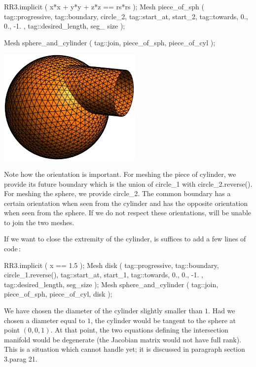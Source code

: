    RR3.implicit ( x*x + y*y + z*z == rs*rs );
   Mesh piece_of_sph ( tag::progressive, tag::boundary, circle_2,
                       tag::start_at, start_2, tag::towards, { 0., 0., -1. },
                       tag::desired_length, seg_ size                         );

   Mesh sphere_and_cylinder ( tag::join, piece_of_sph, piece_of_cyl );
\endverbatim

\medskip
\centerline{\includegraphics[width=70mm]{sphere-cyl.eps}}
\medskip

Note how the orientation is important.
For meshing the piece of cylinder, we provide its future boundary which is the union of
{\codett circle\_1} with {\codett circle\_2.reverse()}.
For meshing the sphere, we provide {\codett circle\_2}.
The common boundary has a certain orientation when seen from the cylinder and has the opposite
orientation when seen from the sphere.
If we do not respect these orientations, {\maniFEM} will be unable to {\codett join} the two
meshes.

If we want to close the extremity of the cylinder, is suffices to add a few lines of code$\,$:

\verbatim
   RR3.implicit ( x == 1.5 );
   Mesh disk ( tag::progressive, tag::boundary, circle_1.reverse(),
               tag::start_at, start_1, tag::towards, { 0., 0., -1. },
               tag::desired_length, seg_size                          );
   Mesh sphere_and_cylinder ( tag::join, piece_of_sph, piece_of_cyl, disk );
\endverbatim

We have chosen the diameter of the cylinder slightly smaller than $1$.
Had we chosen a diameter equal to $1$, the cylinder would be tangent to the sphere at point
$ (0,0,1) $.
At that point, the two equations defining the {\codett intersection} manifold would be
degenerate (the Jacobian matrix would not have full rank).
This is a situation which {\maniFEM} cannot handle yet; it is discussed in paragraph
\numb section 3.\numb parag 21.


